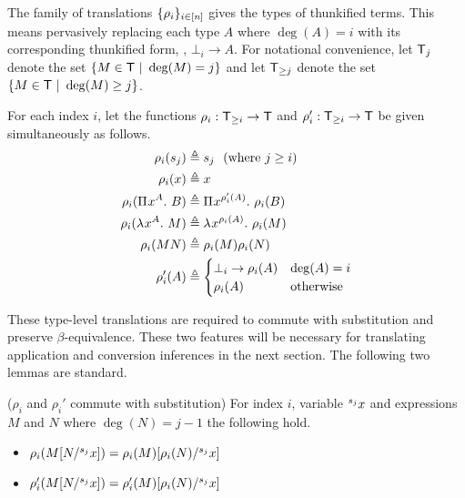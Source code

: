 \documentclass{article}
\begin{document}
The family of translations $\{\rho_i\}_{i \in [n]}$ gives the types of thunkified terms.
This means pervasively replacing each type $A$ where $\deg(A) = i$ with its corresponding thunkified form, \ie, $\bot_i \to A$.
For notational convenience, let $\mathsf{T}_j$ denote the set $\{M \in \mathsf{T} \ | \ \deg(M) = j\}$ and let $\mathsf{T}_{\geq j}$ denote the set $\{M \in \mathsf{T} \ | \ \deg(M) \geq j\}$.

\begin{definition}
For each index $i$, let the functions $\rho_i : \mathsf{T}_{\geq i} \to \mathsf{T}$ and $\rho_i' : \mathsf{T}_{\geq i} \to \mathsf{T}$ be given simultaneously as follows.
\begin{align*}
\rho_i(s_j) &\triangleq s_j \textnormal{\ \ (where $j \geq i$)} \\
\rho_i(x) &\triangleq x \\
\rho_i({\Pi^{} {x}^{A}. \ {B}}) &\triangleq {\Pi^{} {x}^{\rho_i'(A)}. \ {\rho_i(B)}} \\
\rho_i(\lambda^{} x^{A}. \ M) &\triangleq \lambda^{} x^{\rho_i(A)}. \ \rho_i(M) \\
\rho_i(MN) &\triangleq \rho_i(M)\rho_i(N) \\
\rho_i'(A) &\triangleq
\begin{cases}
    \bot_i \to \rho_i(A) & \deg(A) = i \\
    \rho_i(A) & \textnormal{otherwise}
\end{cases} 
\end{align*}
\end{definition}

These type-level translations are required to commute with substitution and preserve $\beta$-equivalence.
These two features will be necessary for translating application and conversion inferences in the next section.
The following two lemmas are standard.

\begin{lemma}
\label{lem:rho-commutes-sub}
($\rho_i$ and $\rho_i'$ commute with substitution) For index $i$, variable ${}^{s_{j}}{x}$ and expressions $M$ and $N$ where $\deg(N) = j - 1$ the following hold.
\begin{itemize}
\item $\rho_i(M[N/{}^{s_{j}}{x}]) = \rho_i(M)[\rho_i(N)/{}^{s_{j}}{x}]$
\item $\rho_i'(M[N/{}^{s_{j}}{x}]) = \rho_i'(M)[\rho_i(N)/{}^{s_{j}}{x}]$
\end{itemize}
\end{lemma}
\end{document}
